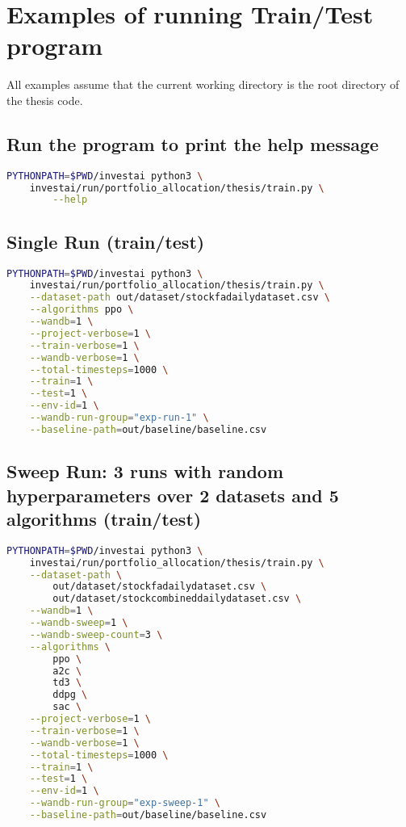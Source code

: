 \documentclass[../xlapes02]{subfiles}
\begin{document}
    \section{Examples of running Train/Test program}
    All examples assume that the current working directory is the root directory of the thesis code.

    \subsection{Run the program to print the help message}
    \begin{lstlisting}[language=bash]
PYTHONPATH=$PWD/investai python3 \
    investai/run/portfolio_allocation/thesis/train.py \
        --help
    \end{lstlisting}

    \subsection{Single Run (train/test)}
    \begin{lstlisting}[language=bash]
PYTHONPATH=$PWD/investai python3 \
    investai/run/portfolio_allocation/thesis/train.py \
    --dataset-path out/dataset/stockfadailydataset.csv \
    --algorithms ppo \
    --wandb=1 \
    --project-verbose=1 \
    --train-verbose=1 \
    --wandb-verbose=1 \
    --total-timesteps=1000 \
    --train=1 \
    --test=1 \
    --env-id=1 \
    --wandb-run-group="exp-run-1" \
    --baseline-path=out/baseline/baseline.csv
    \end{lstlisting}

    \subsection{Sweep Run: 3 runs with random hyperparameters over 2 datasets and 5 algorithms (train/test)}
    \begin{lstlisting}[language=bash]
PYTHONPATH=$PWD/investai python3 \
    investai/run/portfolio_allocation/thesis/train.py \
    --dataset-path \
        out/dataset/stockfadailydataset.csv \
        out/dataset/stockcombineddailydataset.csv \
    --wandb=1 \
    --wandb-sweep=1 \
    --wandb-sweep-count=3 \
    --algorithms \
        ppo \
        a2c \
        td3 \
        ddpg \
        sac \
    --project-verbose=1 \
    --train-verbose=1 \
    --wandb-verbose=1 \
    --total-timesteps=1000 \
    --train=1 \
    --test=1 \
    --env-id=1 \
    --wandb-run-group="exp-sweep-1" \
    --baseline-path=out/baseline/baseline.csv
    \end{lstlisting}
\end{document}
